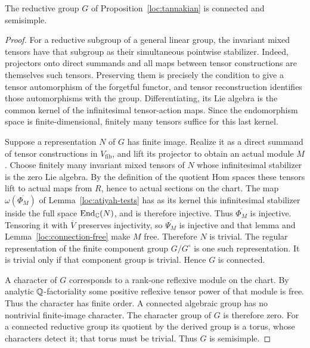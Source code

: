 \begin{proposition}
\label{loc:connected-semisimple}
The reductive group $G$ of Proposition~\ref{loc:tannakian} is
connected and semisimple.
\end{proposition}

\begin{proof}
For a reductive subgroup of a general linear group, the invariant
mixed tensors have that subgroup as their simultaneous pointwise
stabilizer.  Indeed, projectors onto direct summands and all maps
between tensor constructions are themselves such tensors.
Preserving them is precisely the condition to give a tensor
automorphism of the forgetful functor, and tensor reconstruction
identifies those automorphisms with the group.  Differentiating,
its Lie algebra is the common kernel of the infinitesimal
tensor-action maps.  Since the endomorphism space is
finite-dimensional, finitely many tensors suffice for this last
kernel.

Suppose a representation $N$ of $G$ has finite image.  Realize it
as a direct summand of tensor constructions in
$V_{\mathrm{fib}}$, and lift its projector to obtain an actual
module $M$.  Choose finitely many invariant mixed tensors of $N$
whose infinitesimal stabilizer is the zero Lie algebra.  By the
definition of the quotient Hom spaces these tensors lift to actual
maps from $R$, hence to actual sections on the chart.  The map
$\omega(\overline{\Phi_M})$ of Lemma~\ref{loc:atiyah-tests} has as
its kernel this infinitesimal stabilizer inside the full space
$\operatorname{End}_{\mathbb C}(N)$, and is therefore injective.  Thus
$\overline{\Phi_M}$ is injective.  Tensoring it with $\overline V$
preserves injectivity, so $\overline{\Psi_M}$ is injective and that
lemma and Lemma~\ref{loc:connection-free} make $M$ free.
Therefore $N$ is trivial.  The regular representation of the
finite component group $G/G^\circ$ is one such representation.
It is trivial only if that component group is trivial.  Hence $G$
is connected.

A character of $G$ corresponds to a rank-one reflexive module on
the chart.  By analytic $\mathbb Q$-factoriality some positive reflexive
tensor power of that module is free.  Thus the character has
finite order.  A connected algebraic group has no nontrivial
finite-image character.  The character group of $G$ is therefore
zero.  For a connected reductive group its quotient by the derived
group is a torus, whose characters detect it; that torus must be
trivial.  Thus $G$ is semisimple.
\end{proof}

